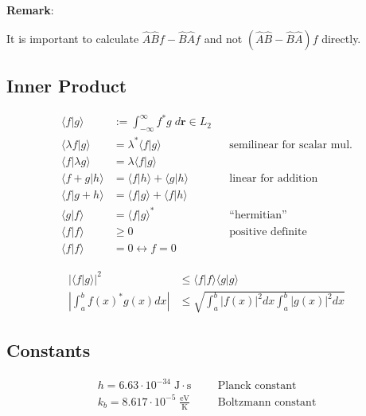 \textbf{Remark}:

It is important to calculate $\widehat{A}\widehat{B}f - \widehat{B}\widehat{A}f$ and not $(\widehat{A}\widehat{B} - \widehat{B}\widehat{A})f$ directly.

\subsection{Inner Product}\label{ssec:InnerProd}
\noindent\begin{align*}
    \langle f|g \rangle         & := \int_{-\infty}^{\infty} f^* g\; d \mathbf{r} \in L_2 &  &                                   \\
    \langle \lambda f|g \rangle & =\lambda^* \langle f|g \rangle                          &  & \text{semilinear for scalar mul.} \\
    \langle f|\lambda g \rangle & =\lambda \langle f|g \rangle                                                                   \\
    \langle f+g|h \rangle       & =\langle f|h \rangle + \langle g|h \rangle              &  & \text{linear for addition}        \\
    \langle f|g+h \rangle       & =\langle f|g \rangle + \langle f|h \rangle                                                     \\
    \langle g|f \rangle         & = {\langle f|g \rangle}^*                               &  & \text{``hermitian''}              \\
    \langle f|f \rangle         & \ge 0                                                   &  & \text{positive definite}          \\
    \langle f|f \rangle         & = 0 \leftrightarrow f=0
\end{align*}

\begin{align*}
    |\langle f|g \rangle |^2                  & \leq \langle f|f \rangle \langle g|g \rangle                 \\
    \left|\int_{a}^{b}{f(x)}^{*}g(x)dx\right| & \leq \sqrt{\int_{a}^{b}|f(x)|^{2}dx\int_{a}^{b}|g(x)|^{2}dx}
\end{align*}

\subsection{Constants}
\noindent\begin{align*}
    h = 6.63 \cdot 10^{-34} \;\mathrm{J\cdot s}      &  &  & \text{Planck constant}    \\
    k_b =8.617 \cdot 10^{-5} \;\mathrm{\frac{eV}{K}} &  &  & \text{Boltzmann constant}
\end{align*}

